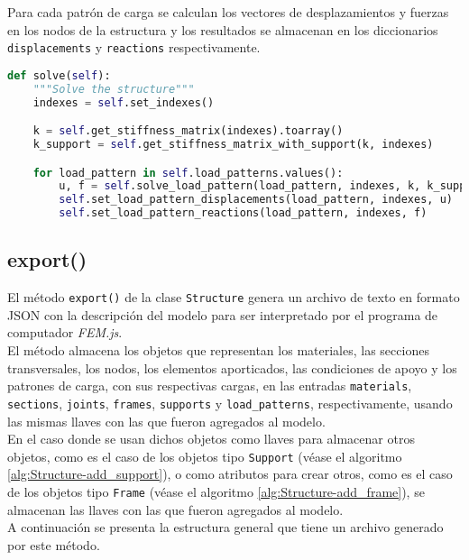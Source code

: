 Para cada patrón de carga se calculan los vectores de desplazamientos y fuerzas en los nodos de la estructura y los resultados se almacenan en los diccionarios \verb|displacements| y \verb|reactions| respectivamente.\\

\begin{lstlisting}[language=Python,caption=Método \texttt{solve()} de la clase \texttt{Structure}.,label=alg:Structure-solve, frame=single]
def solve(self):
    """Solve the structure"""
    indexes = self.set_indexes()

    k = self.get_stiffness_matrix(indexes).toarray()
    k_support = self.get_stiffness_matrix_with_support(k, indexes)

    for load_pattern in self.load_patterns.values():
        u, f = self.solve_load_pattern(load_pattern, indexes, k, k_support)
        self.set_load_pattern_displacements(load_pattern, indexes, u)
        self.set_load_pattern_reactions(load_pattern, indexes, f)
\end{lstlisting}

\subsection{export()}

El método \verb|export()| de la clase \verb|Structure| genera un archivo de texto en formato JSON con la descripción del modelo para ser interpretado por el programa de computador \emph{FEM.js}.\\

El método almacena los objetos que representan los materiales, las secciones transversales, los nodos, los elementos aporticados, las condiciones de apoyo y los patrones de carga, con sus respectivas cargas, en las entradas \verb|materials|, \verb|sections|, \verb|joints|, \verb|frames|, \verb|supports| y \verb|load_patterns|, respectivamente, usando las mismas llaves con las que fueron agregados al modelo.\\

En el caso donde se usan dichos objetos como llaves para almacenar otros objetos, como es el caso de los objetos tipo \verb|Support| (véase el algoritmo \ref{alg:Structure-add_support}), o como atributos para crear otros, como es el caso de los objetos tipo \verb|Frame| (véase el algoritmo \ref{alg:Structure-add_frame}), se almacenan las llaves con las que fueron agregados al modelo.\\

A continuación se presenta la estructura general que tiene un archivo generado por este método.\\

